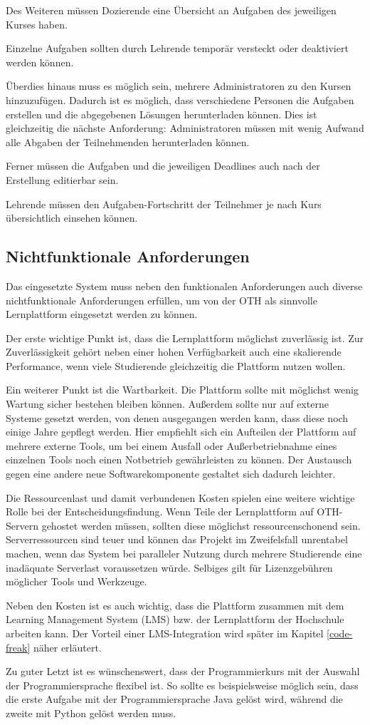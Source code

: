 Des Weiteren müssen Dozierende eine Übersicht an Aufgaben des jeweiligen Kurses
haben.

Einzelne Aufgaben sollten durch Lehrende temporär versteckt oder deaktiviert
werden können.

Überdies hinaus muss es möglich sein, mehrere Administratoren zu den Kursen
hinzuzufügen. Dadurch ist es möglich, dass verschiedene Personen die Aufgaben
erstellen und die abgegebenen Lösungen herunterladen können. Dies ist
gleichzeitig die nächste Anforderung: Administratoren müssen mit wenig
Aufwand alle Abgaben der Teilnehmenden herunterladen können.

Ferner müssen die Aufgaben und die jeweiligen Deadlines auch nach der Erstellung
editierbar sein.

Lehrende müssen den Aufgaben-Fortschritt der Teilnehmer je nach Kurs 
übersichtlich einsehen können.

\subsection{Nichtfunktionale Anforderungen}
\label{anforderungsanalyse-nichtfunktional}
Das eingesetzte System muss neben den funktionalen Anforderungen auch diverse
nichtfunktionale Anforderungen erfüllen, um von der OTH als sinnvolle
Lernplattform eingesetzt werden zu können.

Der erste wichtige Punkt ist, dass die Lernplattform möglichst zuverlässig ist.
Zur Zuverlässigkeit gehört neben einer hohen Verfügbarkeit auch eine skalierende
Performance, wenn viele Studierende gleichzeitig die Plattform nutzen wollen.

Ein weiterer Punkt ist die Wartbarkeit. Die Plattform sollte mit möglichst wenig
Wartung sicher bestehen bleiben können. Außerdem sollte nur auf externe Systeme
gesetzt werden, von denen ausgegangen werden kann, dass diese noch einige Jahre
gepflegt werden. Hier empfiehlt sich ein Aufteilen der Plattform auf mehrere
externe Tools, um bei einem Ausfall oder Außerbetriebnahme eines einzelnen Tools
noch einen Notbetrieb gewährleisten zu können. Der Austausch gegen eine andere
neue Softwarekomponente gestaltet sich dadurch leichter.

Die Ressourcenlast und damit verbundenen Kosten spielen eine weitere wichtige
Rolle bei der Entscheidungsfindung. Wenn Teile der Lernplattform auf OTH-Servern
gehostet werden müssen, sollten diese möglichst ressourcenschonend sein.
Serverressourcen sind teuer und können das Projekt im Zweifelsfall unrentabel
machen, wenn das System bei paralleler Nutzung durch mehrere Studierende eine
inadäquate Serverlast voraussetzen würde. Selbiges gilt für Lizenzgebühren
möglicher Tools und Werkzeuge.

Neben den Kosten ist es auch wichtig, dass die Plattform zusammen mit dem
Learning Management System (LMS) bzw. der Lernplattform der Hochschule arbeiten
kann. Der Vorteil einer LMS-Integration wird später im Kapitel
\ref{code-freak} näher erläutert.

Zu guter Letzt ist es wünschenswert, dass der Programmierkurs mit der Auswahl
der Programmiersprache flexibel ist. So sollte es beispielsweise möglich sein,
dass die erste Aufgabe mit der Programmiersprache Java gelöst wird,
während die zweite mit Python gelöst werden muss.